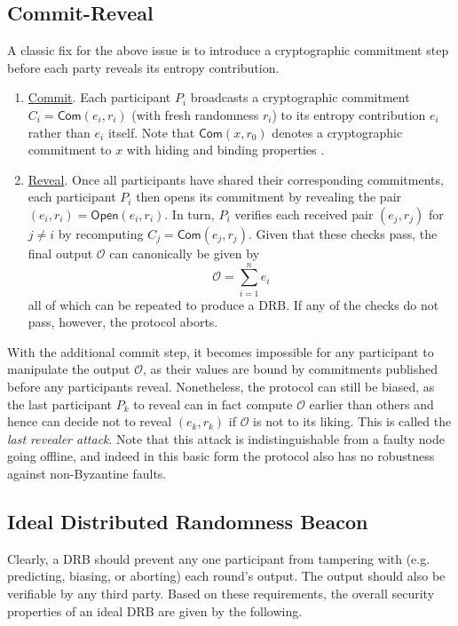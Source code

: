 \documentclass[conference]{IEEEtran}
\theoremstyle{definition}
\theoremstyle{remark}
\begin{document}
\subsection{Commit-Reveal}
\label{subsection:commit-reveal}
A classic fix for the above issue is to introduce a cryptographic commitment step before each party reveals its entropy contribution.
\begin{enumerate}
\item \underline{Commit}. Each participant $P_i$ broadcasts a cryptographic commitment $C_i = \mathsf{Com}(e_i, r_i)$ (with fresh randomness $r_i$) to its entropy contribution $e_i$ rather than $e_i$ itself. Note that $\mathsf{Com}(x, r_0)$ denotes a cryptographic commitment to $x$ with hiding and binding properties \cite{blum1983coin,damgaard1998commitment}.
\item \underline{Reveal}. Once all participants have shared their corresponding commitments, each participant $P_i$ then opens its commitment by revealing the pair $(e_i, r_i) = \mathsf{Open}(e_i, r_i)$. In turn, $P_i$ verifies each received pair $(e_j, r_j)$ for $j \neq i$ by recomputing $C_j = \mathsf{Com}(e_j, r_j)$. Given that these checks pass, the final output $\mathcal{O}$ can canonically be given by
\[
\mathcal{O} = \sum_{i = 1}^n e_i
\]
all of which can be repeated to produce a DRB. If any of the checks do not pass, however, the protocol aborts.
\end{enumerate}

With the additional commit step, it becomes impossible for any participant to manipulate the output $\mathcal{O}$, as their values are bound by commitments published before any participants reveal.
Nonetheless, the protocol can still be biased, as the last participant $P_k$ to reveal can in fact compute $\mathcal{O}$ earlier than others and hence can decide not to reveal $(e_k, r_k)$ if $\mathcal{O}$ is not to its liking. This is called the \textit{last revealer attack}.
Note that this attack is indistinguishable from a faulty node going offline, and indeed in this basic form the protocol also has no robustness against non-Byzantine faults.

\subsection{Ideal Distributed Randomness Beacon}
Clearly, a DRB should prevent any one participant from tampering with (e.g. predicting, biasing, or aborting) each round's output. The output should also be verifiable by any third party. Based on these requirements, the overall security properties of an ideal DRB are given by the following.
\end{document}
